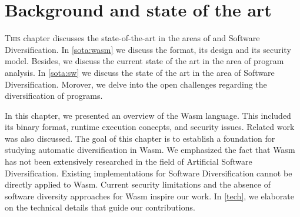 \chapter{Background and state of the art}
\label{SOTA}

\lettrine[lines=4]{T}{his} chapter discusses the state-of-the-art in the areas of \Wasm and Software Diversification. 
In \autoref{sota:wasm} we discuss the \Wasm format, its design and its security model.
Besides, we discuss the current state of the art in the area of \Wasm program analysis.
In \autoref{sota:sw} we discuss the state of the art in the area of Software Diversification.
Morover, we delve into the open challenges regarding the diversification of \Wasm programs.







In this chapter, we presented an overview of the Wasm language. 
This included its binary format, runtime execution concepts, and security issues. 
Related work was also discussed. 
The goal of this chapter is to establish a foundation for studying automatic diversification in Wasm. 
We emphasized the fact that Wasm has not been extensively researched in the field of Artificial Software Diversification. 
Existing implementations for Software Diversification cannot be directly applied to Wasm. 
Current security limitations and the absence of software diversity approaches for Wasm inspire our work. 
In \autoref{tech}, we elaborate on the technical details that guide our contributions.
